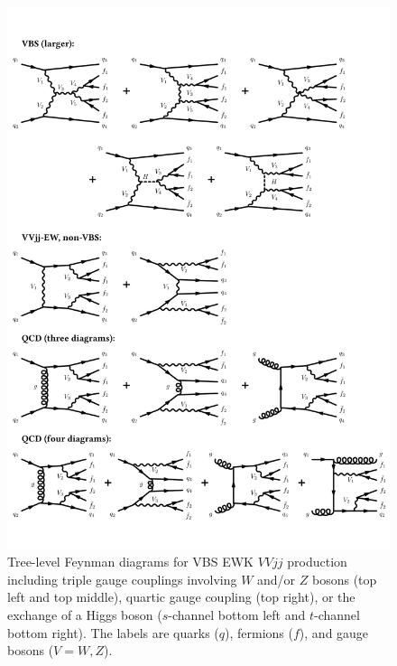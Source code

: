 \begin{figure}[htbp]
  \centering
  \includegraphics[width=.8\textwidth]{figs/ssww_13tev/diagrams/Vbscore}
  \caption{Tree-level Feynman diagrams for VBS EWK $VVjj$ production including triple gauge couplings involving $W$ and/or $Z$ bosons (top left and top middle), quartic gauge coupling (top right), or the exchange of a Higgs boson ($s$-channel bottom left and $t$-channel bottom right).  The labels are quarks ($q$), fermions ($f$), and gauge bosons ($V = W,Z$). }
  \label{fig:ssww13tev_diagrams_vbs}
\end{figure}

